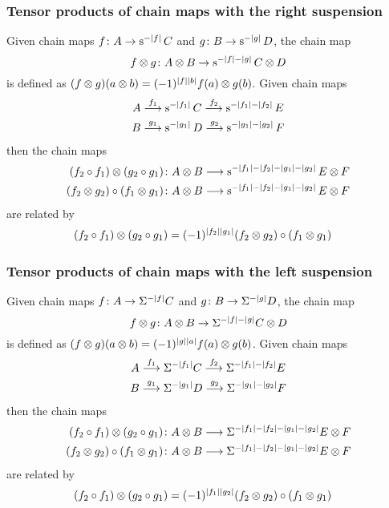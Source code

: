 \subsubsection{Tensor products of chain maps with the right suspension}

Given chain maps $f \colon A \to \operatorname{s}^{-|f|}C$ and $g \colon B \to \operatorname{s}^{-|g|}D$, the chain map
\[
	f \otimes g \colon A \otimes B \to \operatorname{s}^{-|f|-|g|}C \otimes D
\]
is defined as $(f \otimes g)(a \otimes b) = (-1)^{|f||b|} f(a) \otimes g(b)$. Given chain maps
\begin{align*}
	A & \overset{f_1}{\longrightarrow} \operatorname{s}^{-|f_1|} C \overset{f_2}{\longrightarrow} \operatorname{s}^{-|f_1|-|f_2|} E \\
	B & \overset{g_1}{\longrightarrow} \operatorname{s}^{-|g_1|} D \overset{g_2}{\longrightarrow} \operatorname{s}^{-|g_1|-|g_2|} F \\
\end{align*}
then the chain maps
\begin{align*}
(f_2\circ f_1) \otimes (g_2\circ g_1) \colon &A \otimes B \longrightarrow \operatorname{s}^{-|f_1|-|f_2|-|g_1|-|g_2|}E \otimes F
\\
(f_2 \otimes g_2)\circ (f_1 \otimes g_1) \colon &A \otimes B \longrightarrow \operatorname{s}^{-|f_1|-|f_2|-|g_1|-|g_2|}E \otimes F
\end{align*}
 are related by
\begin{align*}
	(f_2\circ f_1) \otimes (g_2\circ g_1) &= (-1)^{|f_2||g_1|}(f_2 \otimes g_2)\circ (f_1 \otimes g_1)
\end{align*}

\subsubsection{Tensor products of chain maps with the left suspension}

Given chain maps $f \colon A \to \Sigma^{-|f|}C$ and $g \colon B \to \Sigma^{-|g|}D$, the chain map
\[
f \otimes g \colon A \otimes B \to \Sigma^{-|f|-|g|}C \otimes D
\]
is defined as $(f \otimes g)(a \otimes b) = (-1)^{|g||a|} f(a) \otimes g(b)$. Given chain maps
\begin{align*}
	A & \overset{f_1}{\longrightarrow} \Sigma^{-|f_1|} C \overset{f_2}{\longrightarrow} \Sigma^{-|f_1|-|f_2|} E \\
	B & \overset{g_1}{\longrightarrow} \Sigma^{-|g_1|} D \overset{g_2}{\longrightarrow} \Sigma^{-|g_1|-|g_2|} F \\
\end{align*}
then the chain maps
\begin{align*}
(f_2\circ f_1) \otimes (g_2\circ g_1) \colon &A \otimes B \longrightarrow \Sigma^{-|f_1|-|f_2|-|g_1|-|g_2|}E \otimes F
\\
(f_2 \otimes g_2)\circ (f_1 \otimes g_1) \colon &A \otimes B \longrightarrow \Sigma^{-|f_1|-|f_2|-|g_1|-|g_2|}E \otimes F
\end{align*}
 are related by
\begin{align*}
	(f_2\circ f_1) \otimes (g_2\circ g_1) &= (-1)^{|f_1||g_2|}(f_2 \otimes g_2)\circ (f_1 \otimes g_1)
\end{align*}

